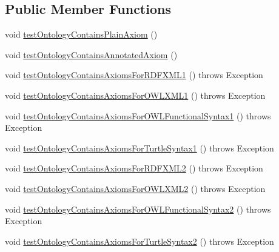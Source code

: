 \subsection*{Public Member Functions}
\begin{DoxyCompactItemize}
\item 
void \hyperlink{classorg_1_1semanticweb_1_1owlapi_1_1api_1_1test_1_1ontology_1_1_ontology_contains_axiom_test_case_a04ebf236ac499b2b600206462fa2226e}{test\-Ontology\-Contains\-Plain\-Axiom} ()
\item 
void \hyperlink{classorg_1_1semanticweb_1_1owlapi_1_1api_1_1test_1_1ontology_1_1_ontology_contains_axiom_test_case_aea9b923ecd02f5b1cc77e4ecaed8d08a}{test\-Ontology\-Contains\-Annotated\-Axiom} ()
\item 
void \hyperlink{classorg_1_1semanticweb_1_1owlapi_1_1api_1_1test_1_1ontology_1_1_ontology_contains_axiom_test_case_a63cffff3936edfadf3639ba19ca274fc}{test\-Ontology\-Contains\-Axioms\-For\-R\-D\-F\-X\-M\-L1} ()  throws Exception 
\item 
void \hyperlink{classorg_1_1semanticweb_1_1owlapi_1_1api_1_1test_1_1ontology_1_1_ontology_contains_axiom_test_case_a22ea1fec1445eaaf6f315d1cb320f958}{test\-Ontology\-Contains\-Axioms\-For\-O\-W\-L\-X\-M\-L1} ()  throws Exception 
\item 
void \hyperlink{classorg_1_1semanticweb_1_1owlapi_1_1api_1_1test_1_1ontology_1_1_ontology_contains_axiom_test_case_a7273cc72ba02fcb6db7cb5f392c99ca9}{test\-Ontology\-Contains\-Axioms\-For\-O\-W\-L\-Functional\-Syntax1} ()  throws Exception 
\item 
void \hyperlink{classorg_1_1semanticweb_1_1owlapi_1_1api_1_1test_1_1ontology_1_1_ontology_contains_axiom_test_case_a11fc8b1ef86332fd57578fcfabdcbfa7}{test\-Ontology\-Contains\-Axioms\-For\-Turtle\-Syntax1} ()  throws Exception 
\item 
void \hyperlink{classorg_1_1semanticweb_1_1owlapi_1_1api_1_1test_1_1ontology_1_1_ontology_contains_axiom_test_case_a6b8840a2b5c291e63d56031a869b148f}{test\-Ontology\-Contains\-Axioms\-For\-R\-D\-F\-X\-M\-L2} ()  throws Exception 
\item 
void \hyperlink{classorg_1_1semanticweb_1_1owlapi_1_1api_1_1test_1_1ontology_1_1_ontology_contains_axiom_test_case_ab6d599cc2d95d4b9680e97bdb93b0e16}{test\-Ontology\-Contains\-Axioms\-For\-O\-W\-L\-X\-M\-L2} ()  throws Exception 
\item 
void \hyperlink{classorg_1_1semanticweb_1_1owlapi_1_1api_1_1test_1_1ontology_1_1_ontology_contains_axiom_test_case_ab82753230fd60808ff4a0163ee722b60}{test\-Ontology\-Contains\-Axioms\-For\-O\-W\-L\-Functional\-Syntax2} ()  throws Exception 
\item 
void \hyperlink{classorg_1_1semanticweb_1_1owlapi_1_1api_1_1test_1_1ontology_1_1_ontology_contains_axiom_test_case_af1511d1e3dec5fbb7a4841290943f07e}{test\-Ontology\-Contains\-Axioms\-For\-Turtle\-Syntax2} ()  throws Exception 
\end{DoxyCompactItemize}
